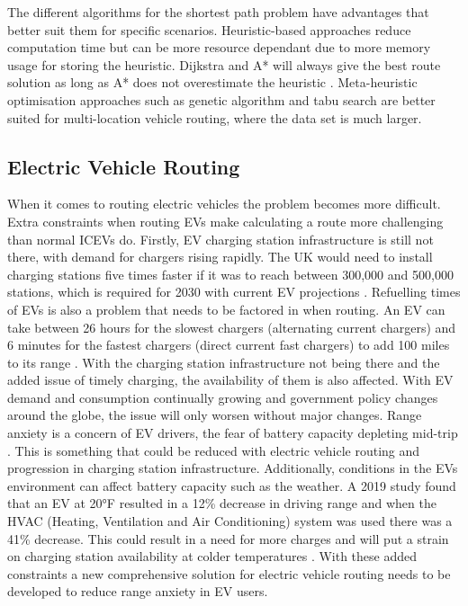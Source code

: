 \documentclass[11pt]{report}
\begin{document}
The different algorithms for the shortest path problem have advantages that better suit them for specific scenarios. Heuristic-based approaches reduce computation time but can be more resource dependant due to more memory usage for storing the heuristic. Dijkstra and A* will always give the best route solution as long as A* does not overestimate the heuristic \autocite{wang2013comprehensive}. Meta-heuristic optimisation approaches such as genetic algorithm and tabu search are better suited for multi-location vehicle routing, where the data set is much larger.

\subsection{Electric Vehicle Routing}

When it comes to routing electric vehicles the problem becomes more difficult. Extra constraints when routing EVs make calculating a route more challenging than normal ICEVs do. Firstly, EV charging station infrastructure is still not there, with demand for chargers rising rapidly. The UK would need to install charging stations five times faster if it was to reach between 300,000 and 500,000 stations, which is required for 2030 with current EV projections \autocite{charginUpPolicyExchange}. Refuelling times of EVs is also a problem that needs to be factored in when routing. An EV can take between 26 hours for the slowest chargers (alternating current chargers) and 6 minutes for the fastest chargers (direct current fast chargers) to add 100 miles to its range \autocite{lee2018charging}. With the charging station infrastructure not being there and the added issue of timely charging, the availability of them is also affected. With EV demand and consumption continually growing and government policy changes around the globe, the issue will only worsen without major changes. Range anxiety is a concern of EV drivers, the fear of battery capacity depleting mid-trip \autocite{neubauer2014impact}. This is something that could be reduced with electric vehicle routing and progression in charging station infrastructure. Additionally, conditions in the EVs environment can affect battery capacity such as the weather. A 2019 study found that an EV at 20°F resulted in a 12\% decrease in driving range and when the HVAC (Heating, Ventilation and Air Conditioning) system was used there was a 41\% decrease. This could result in a need for more charges and will put a strain on charging station availability at colder temperatures \autocite{aaaEVWeather}. With these added constraints a new comprehensive solution for electric vehicle routing needs to be developed to reduce range anxiety in EV users.
\end{document}
